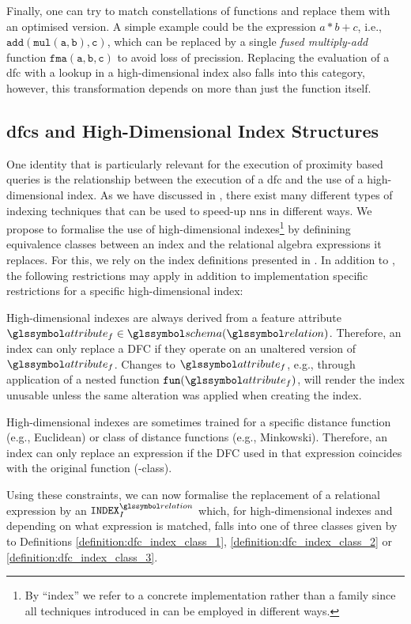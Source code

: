Finally, one can try to match constellations of functions and replace them with an optimised version. A simple example could be the expression $a * b + c$, i.e., $\mathtt{add}(\mathtt{mul}(\mathtt{a},\mathtt{b}), \mathtt{c})$, which can be replaced by a single \emph{fused multiply-add} function $\mathtt{fma}(\mathtt{a},\mathtt{b},\mathtt{c})$ to avoid loss of precission. Replacing the evaluation of a \acrshort{dfc} with a lookup in a high-dimensional index also falls into this category, however, this transformation depends on more than just the function itself.

\subsection{\texorpdfstring{\acrshort{dfc}s}{DFCs} and High-Dimensional Index Structures}

One identity that is particularly relevant for the execution of proximity based queries is the relationship between the execution of a \acrshort{dfc} and the use of a high-dimensional index. As we have discussed in , there exist many different types of indexing techniques that can be used to speed-up \acrshort{nns} in different ways. We propose to formalise the use of high-dimensional indexes\footnote{By ``index'' we refer to a concrete implementation rather than a family since all techniques introduced in  can be employed in different ways.} by definining equivalence classes between an index and the relational algebra expressions it replaces. For this, we rely on the index definitions presented in . In addition to , the following restrictions may apply in addition to implementation specific restrictions for a specific high-dimensional index: 
\begin{enumerate*}[label=(\roman*)]
    \item High-dimensional indexes are always derived from a feature attribute $\attribute_f \in \schema(\relation)$. Therefore, an index can only replace a DFC if they operate on an unaltered version of $\attribute_f$. Changes to $\attribute_f$, e.g., through application of a nested function $\mathtt{fun}(\attribute_f)$, will render the index unusable unless the same alteration was applied when creating the index.
    \item High-dimensional indexes are sometimes trained for a specific distance function (e.g., Euclidean) or class of distance functions (e.g., Minkowski). Therefore, an index can only replace an expression if the DFC used in that expression coincides with the original function (-class).
\end{enumerate*} Using these constraints, we can now formalise the replacement of a relational expression by an $\mathtt{INDEX}^{\relation}_{I}$ which, for high-dimensional indexes and depending on what expression is matched, falls into one of three classes given by to Definitions \ref{definition:dfc_index_class_1}, \ref{definition:dfc_index_class_2} or \ref{definition:dfc_index_class_3}.

